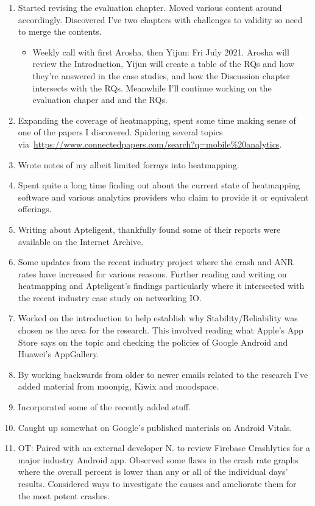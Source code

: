 \begin{enumerate}
    \item Started revising the evaluation chapter. Moved various content around accordingly. Discovered I've two chapters with challenges to validity so need to merge the contents.
    \begin{itemize}
        \item Weekly call with first Arosha, then Yijun: Fri  July 2021. Arosha will review the Introduction, Yijun will create a table of the RQs and how they're answered in the case studies, and how the Discussion chapter intersects with the RQs. Meanwhile I'll continue working on the evaluation chaper and and the RQs.
    \end{itemize}
    \item Expanding the coverage of heatmapping, spent some time making sense of one of the papers I discovered. Spidering several topics via~\url{https://www.connectedpapers.com/search?q=mobile\%20analytics}.
    \item Wrote notes of my albeit limited forrays into heatmapping.
    \item Spent quite a long time finding out about the current state of heatmapping software and various analytics providers who claim to provide it or equivalent offerings.
    \item Writing about Apteligent, thankfully found some of their reports were available on the Internet Archive.
    \item Some updates from the recent industry project where the crash and ANR rates have increased for various reasons. Further reading and writing on heatmapping and Apteligent's findings particularly where it intersected with the recent industry case study on networking IO.
    \item Worked on the introduction to help establish why Stability/Reliability was chosen as the area for the research. This involved reading what Apple's App Store says on the topic and checking the policies of Google Android and Huawei's AppGallery.
    \item By working backwards from older to newer emails related to the research I've added material from moonpig, Kiwix and moodspace.
    \item Incorporated some of the recently added stuff.
    \item Caught up somewhat on Google's published materials on Android Vitals.
    \item OT: Paired with an external developer N. to review Firebase Crashlytics for a major industry Android app. Observed some flaws in the crash rate graphs where the overall percent is lower than any or all of the individual days' results. Considered ways to investigate the causes and ameliorate them for the most potent crashes.

\end{enumerate}
